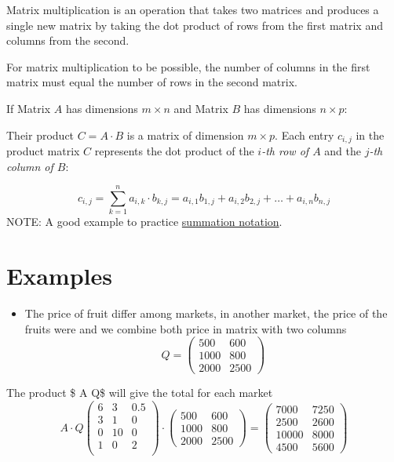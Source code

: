 \documentclass[
  letterpaper,
  DIV=11,
  numbers=noendperiod]{scrreprt}
\providecommand{\tightlist}{%
  \setlength{\itemsep}{0pt}\setlength{\parskip}{0pt}}
\begin{document}

Matrix multiplication is an operation that takes two matrices and
produces a single new matrix by taking the dot product of rows from the
first matrix and columns from the second.

For matrix multiplication to be possible, the number of columns in the
first matrix must equal the number of rows in the second matrix.

If Matrix \(A\) has dimensions \(m \times n\) and Matrix \(B\) has
dimensions \(n \times p\):

Their product \(C = A \cdot B\) is a matrix of dimension \(m \times p\).
Each entry \(c_{i,j}\) in the product matrix \(C\) represents the dot
product of the \emph{\(i\)-th row of \(A\)} and the \emph{\(j\)-th
column of \(B\)}:

\[c_{i,j} = \sum_{k=1}^{n} a_{i,k} \cdot b_{k,j} = a_{i,1}b_{1,j} + a_{i,2}b_{2,j} + \dots + a_{i,n}b_{n,j}\]
NOTE: A good example to practice \href{@sec-sum}{summation notation}.

\section*{Examples}\label{examples-6}


\begin{itemize}
\tightlist
\item
  The price of fruit differ among markets, in another market, the price
  of the fruits were and we combine both price in matrix with two
  columns \[
  Q =
  \begin{pmatrix}
    500 & 600 \\
    1000  & 800 \\
    2000 & 2500
  \end{pmatrix}
  \]
\end{itemize}

The product \$ A \cdot Q\$ will give the total for each market
\[ A \cdot Q
\begin{pmatrix}
    6 & 3 & 0.5 \\
    3 & 1 & 0 \\
    0 & 10 & 0 \\
    1 & 0 & 2 \\
\end{pmatrix}
\cdot
\begin{pmatrix}
    500 & 600 \\
    1000  & 800 \\
    2000 & 2500
\end{pmatrix} =
\begin{pmatrix}
  7000 & 7250 \\
  2500 & 2600 \\
  10000 & 8000 \\
  4500 & 5600
\end{pmatrix}
\]
\end{document}
